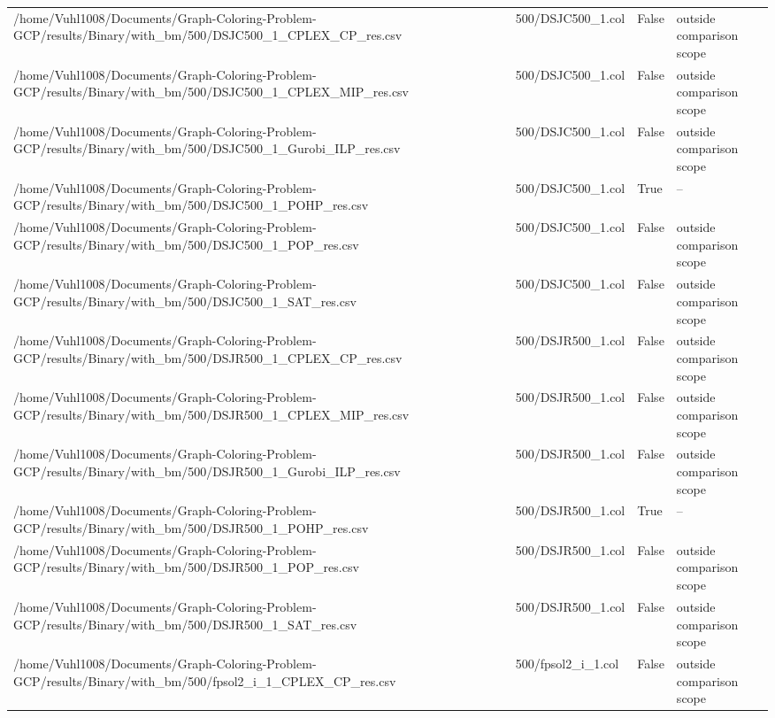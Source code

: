 \begin{table}[htbp]
\begin{tabular}{llll}
/home/Vuhl1008/Documents/Graph-Coloring-Problem-GCP/results/Binary/with\_bm/500/DSJC500\_1\_CPLEX\_CP\_res.csv & 500/DSJC500\_1.col & False & outside comparison scope \\
/home/Vuhl1008/Documents/Graph-Coloring-Problem-GCP/results/Binary/with\_bm/500/DSJC500\_1\_CPLEX\_MIP\_res.csv & 500/DSJC500\_1.col & False & outside comparison scope \\
/home/Vuhl1008/Documents/Graph-Coloring-Problem-GCP/results/Binary/with\_bm/500/DSJC500\_1\_Gurobi\_ILP\_res.csv & 500/DSJC500\_1.col & False & outside comparison scope \\
/home/Vuhl1008/Documents/Graph-Coloring-Problem-GCP/results/Binary/with\_bm/500/DSJC500\_1\_POHP\_res.csv & 500/DSJC500\_1.col & True & -- \\
/home/Vuhl1008/Documents/Graph-Coloring-Problem-GCP/results/Binary/with\_bm/500/DSJC500\_1\_POP\_res.csv & 500/DSJC500\_1.col & False & outside comparison scope \\
/home/Vuhl1008/Documents/Graph-Coloring-Problem-GCP/results/Binary/with\_bm/500/DSJC500\_1\_SAT\_res.csv & 500/DSJC500\_1.col & False & outside comparison scope \\
/home/Vuhl1008/Documents/Graph-Coloring-Problem-GCP/results/Binary/with\_bm/500/DSJR500\_1\_CPLEX\_CP\_res.csv & 500/DSJR500\_1.col & False & outside comparison scope \\
/home/Vuhl1008/Documents/Graph-Coloring-Problem-GCP/results/Binary/with\_bm/500/DSJR500\_1\_CPLEX\_MIP\_res.csv & 500/DSJR500\_1.col & False & outside comparison scope \\
/home/Vuhl1008/Documents/Graph-Coloring-Problem-GCP/results/Binary/with\_bm/500/DSJR500\_1\_Gurobi\_ILP\_res.csv & 500/DSJR500\_1.col & False & outside comparison scope \\
/home/Vuhl1008/Documents/Graph-Coloring-Problem-GCP/results/Binary/with\_bm/500/DSJR500\_1\_POHP\_res.csv & 500/DSJR500\_1.col & True & -- \\
/home/Vuhl1008/Documents/Graph-Coloring-Problem-GCP/results/Binary/with\_bm/500/DSJR500\_1\_POP\_res.csv & 500/DSJR500\_1.col & False & outside comparison scope \\
/home/Vuhl1008/Documents/Graph-Coloring-Problem-GCP/results/Binary/with\_bm/500/DSJR500\_1\_SAT\_res.csv & 500/DSJR500\_1.col & False & outside comparison scope \\
/home/Vuhl1008/Documents/Graph-Coloring-Problem-GCP/results/Binary/with\_bm/500/fpsol2\_i\_1\_CPLEX\_CP\_res.csv & 500/fpsol2\_i\_1.col & False & outside comparison scope \\

\end{tabular}
\end{table}
